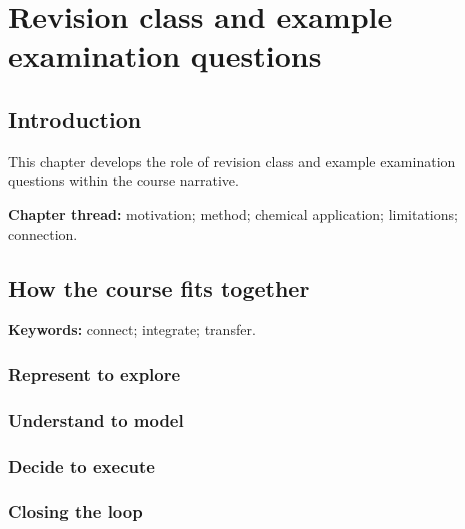 
\chapter{Revision class and example examination questions}

\section{Introduction}

This chapter develops the role of revision class and example examination questions within the course narrative.

\begin{insightbox}
\textbf{Chapter thread:} motivation; method; chemical application; limitations; connection.
\end{insightbox}

\section{How the course fits together}

\begin{insightbox}
\textbf{Keywords:} connect; integrate; transfer.
\end{insightbox}

\subsection{Represent to explore}


\subsection{Understand to model}


\subsection{Decide to execute}


\subsection{Closing the loop}

